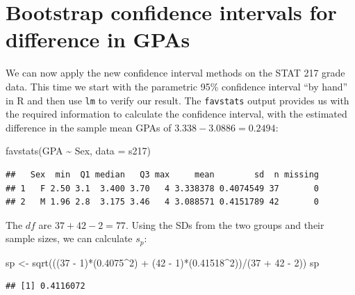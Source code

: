 \documentclass[
]{book}
\newenvironment{Shaded}{\begin{snugshade}}{\end{snugshade}}
\newcommand{\AttributeTok}[1]{\textcolor[rgb]{0.77,0.63,0.00}{#1}}
\newcommand{\DecValTok}[1]{\textcolor[rgb]{0.00,0.00,0.81}{#1}}
\newcommand{\FloatTok}[1]{\textcolor[rgb]{0.00,0.00,0.81}{#1}}
\newcommand{\FunctionTok}[1]{\textcolor[rgb]{0.00,0.00,0.00}{#1}}
\newcommand{\NormalTok}[1]{#1}
\newcommand{\OtherTok}[1]{\textcolor[rgb]{0.56,0.35,0.01}{#1}}
\newcommand{\SpecialCharTok}[1]{\textcolor[rgb]{0.00,0.00,0.00}{#1}}
\begin{document}
\hypertarget{section2-10}{%
\section{Bootstrap confidence intervals for difference in GPAs}\label{section2-10}}

We can now apply the new confidence interval methods on the STAT 217 grade data.
This time we start with the parametric 95\% confidence interval ``by hand'' in R
and then use \texttt{lm} to verify our result. The \texttt{favstats} output provides
us with the required information to calculate the confidence interval, with the estimated difference in the sample mean GPAs of \(3.338-3.0886 = 0.2494\):

\begin{Shaded}
\begin{Highlighting}[]
\FunctionTok{favstats}\NormalTok{(GPA }\SpecialCharTok{\textasciitilde{}}\NormalTok{ Sex, }\AttributeTok{data =}\NormalTok{ s217)}
\end{Highlighting}
\end{Shaded}

\begin{verbatim}
##   Sex  min  Q1 median   Q3 max     mean        sd  n missing
## 1   F 2.50 3.1  3.400 3.70   4 3.338378 0.4074549 37       0
## 2   M 1.96 2.8  3.175 3.46   4 3.088571 0.4151789 42       0
\end{verbatim}

The \(df\) are \(37+42-2 = 77\). Using the SDs from the two groups and their sample
sizes, we can calculate \(s_p\):

\begin{Shaded}
\begin{Highlighting}[]
\NormalTok{sp }\OtherTok{\textless{}{-}} \FunctionTok{sqrt}\NormalTok{(((}\DecValTok{37} \SpecialCharTok{{-}} \DecValTok{1}\NormalTok{)}\SpecialCharTok{*}\NormalTok{(}\FloatTok{0.4075}\SpecialCharTok{\^{}}\DecValTok{2}\NormalTok{) }\SpecialCharTok{+}\NormalTok{ (}\DecValTok{42} \SpecialCharTok{{-}} \DecValTok{1}\NormalTok{)}\SpecialCharTok{*}\NormalTok{(}\FloatTok{0.41518}\SpecialCharTok{\^{}}\DecValTok{2}\NormalTok{))}\SpecialCharTok{/}\NormalTok{(}\DecValTok{37} \SpecialCharTok{+} \DecValTok{42} \SpecialCharTok{{-}} \DecValTok{2}\NormalTok{))}
\NormalTok{sp}
\end{Highlighting}
\end{Shaded}

\begin{verbatim}
## [1] 0.4116072
\end{verbatim}
\end{document}
